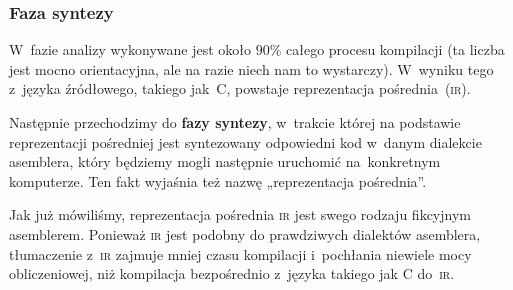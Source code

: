 \documentclass[10pt,t]{beamer}
\begin{document}
\begin{frame}
  \frametitle{Faza syntezy}


  W~fazie analizy wykonywane jest około $90\%$ całego procesu kompilacji
  (ta liczba jest mocno orientacyjna, ale na razie niech nam to wystarczy).
  W~wyniku tego z~języka źródłowego, takiego jak~C, powstaje reprezentacja
  pośrednia~(\textsc{ir}).

  Następnie przechodzimy do \textbf{fazy syntezy}, w~trakcie której na
  podstawie reprezentacji pośredniej jest \alert{syntezowany} odpowiedni
  kod w~danym dialekcie asemblera, który będziemy mogli następnie uruchomić
  na~konkretnym komputerze. Ten fakt wyjaśnia też nazwę „reprezentacja
  pośrednia”.

  Jak już mówiliśmy, reprezentacja pośrednia \textsc{ir} jest swego rodzaju
  fikcyjnym asemblerem. Ponieważ \textsc{ir} jest podobny do prawdziwych
  dialektów asemblera, tłumaczenie z~\textsc{ir} zajmuje mniej
  czasu kompilacji i~pochłania niewiele mocy obliczeniowej, niż kompilacja
  bezpośrednio z~języka takiego jak C do~\textsc{ir}.

\end{frame}
\end{document}
